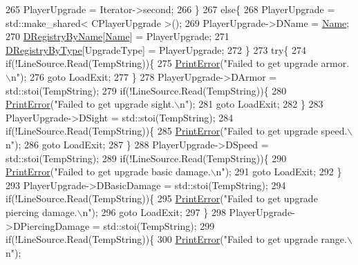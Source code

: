 \begin{DoxyCode}
{265         PlayerUpgrade = Iterator->second;
266     \}
267     \textcolor{keywordflow}{else}\{
268         PlayerUpgrade = std::make\_shared< CPlayerUpgrade >();
269         PlayerUpgrade->DName = \hyperlink{classCPlayerUpgrade_a9030c62bc29150957f2fb6485ee9c01f}{Name};
270         \hyperlink{classCPlayerUpgrade_a33e022bd67ce2f4d9ce83dfd0b7289f6}{DRegistryByName}[\hyperlink{classCPlayerUpgrade_a9030c62bc29150957f2fb6485ee9c01f}{Name}] = PlayerUpgrade;
271         \hyperlink{classCPlayerUpgrade_a04673f65215501e9eb0ce7828091c30c}{DRegistryByType}[UpgradeType] = PlayerUpgrade;
272     \}
273     \textcolor{keywordflow}{try}\{
274         \textcolor{keywordflow}{if}(!LineSource.Read(TempString))\{
275             \hyperlink{Debug_8h_a2ed825eefefe35baf59a93a8c641323d}{PrintError}(\textcolor{stringliteral}{"Failed to get upgrade armor.\(\backslash\)n"});
276             \textcolor{keywordflow}{goto} LoadExit;
277         \}
278         PlayerUpgrade->DArmor = std::stoi(TempString);
279         \textcolor{keywordflow}{if}(!LineSource.Read(TempString))\{
280             \hyperlink{Debug_8h_a2ed825eefefe35baf59a93a8c641323d}{PrintError}(\textcolor{stringliteral}{"Failed to get upgrade sight.\(\backslash\)n"});
281             \textcolor{keywordflow}{goto} LoadExit;
282         \}
283         PlayerUpgrade->DSight = std::stoi(TempString);
284         \textcolor{keywordflow}{if}(!LineSource.Read(TempString))\{
285             \hyperlink{Debug_8h_a2ed825eefefe35baf59a93a8c641323d}{PrintError}(\textcolor{stringliteral}{"Failed to get upgrade speed.\(\backslash\)n"});
286             \textcolor{keywordflow}{goto} LoadExit;
287         \}
288         PlayerUpgrade->DSpeed = std::stoi(TempString);
289         \textcolor{keywordflow}{if}(!LineSource.Read(TempString))\{
290             \hyperlink{Debug_8h_a2ed825eefefe35baf59a93a8c641323d}{PrintError}(\textcolor{stringliteral}{"Failed to get upgrade basic damage.\(\backslash\)n"});
291             \textcolor{keywordflow}{goto} LoadExit;
292         \}
293         PlayerUpgrade->DBasicDamage = std::stoi(TempString);
294         \textcolor{keywordflow}{if}(!LineSource.Read(TempString))\{
295             \hyperlink{Debug_8h_a2ed825eefefe35baf59a93a8c641323d}{PrintError}(\textcolor{stringliteral}{"Failed to get upgrade piercing damage.\(\backslash\)n"});
296             \textcolor{keywordflow}{goto} LoadExit;
297         \}
298         PlayerUpgrade->DPiercingDamage = std::stoi(TempString);
299         \textcolor{keywordflow}{if}(!LineSource.Read(TempString))\{
300             \hyperlink{Debug_8h_a2ed825eefefe35baf59a93a8c641323d}{PrintError}(\textcolor{stringliteral}{"Failed to get upgrade range.\(\backslash\)n"});
}
\end{DoxyCode}
